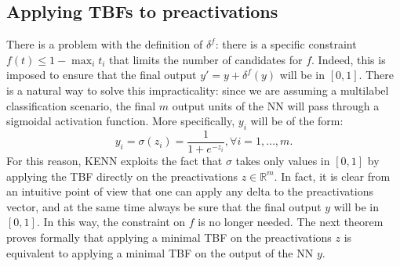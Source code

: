\subsection{Applying TBFs to preactivations} 
There is a problem with the definition of $\delta^f$: there is a specific constraint $f(t) \leq 1 - \max_i t_i$ that limits the number of candidates for $f$. Indeed, this is imposed to ensure that the final output $y'= y + \delta^f(y)$ will be in $\left[0,1\right]$. There is a natural way to solve this impracticality: since we are assuming a multilabel classification scenario, the final $m$ output units of the NN will pass through a sigmoidal activation function. More specifically, $y_i$ will be of the form:
\begin{equation*}
y_i = \sigma(z_i) = \frac{1}{1+e^{-z_i}}, \forall i=1,\dots,m.	
\end{equation*}
For this reason, KENN exploits the fact that $\sigma$ takes only values in $\left[0,1\right]$ by applying the TBF directly on the preactivations $z\in \mathbb{R}^m$. In fact, it is clear from an intuitive point of view that one can apply any delta to the preactivations vector, and at the same time always be sure that the final output $y$ will be in $\left[0,1\right]$. In this way, the constraint on $f$ is no longer needed. The next theorem proves formally that applying a minimal TBF on the preactivations $z$ is equivalent to applying a minimal TBF on the output of the NN $y$.

